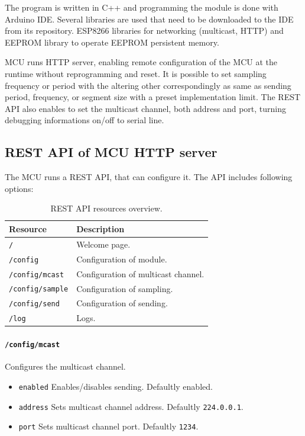 The program is written in C++ and programming the module is done with Arduino IDE. Several libraries
are used that need to be downloaded to the IDE from its repository. ESP8266 libraries for networking
(multicast, HTTP) and EEPROM library to operate EEPROM persistent memory.

MCU runs HTTP server, enabling remote configuration of the MCU at the runtime without reprogramming
and reset. It is possible to set sampling frequency or period with the altering other correspondingly
as same as sending period, frequency, or segment size with a preset implementation limit.
The REST API also enables to set the multicast channel, both address and port, turning
debugging informations on/off to serial line.

\subsection*{REST API of MCU HTTP server}
The MCU runs a REST API, that can configure it. The API includes following options:

\begin{table}[h!]
    \begin{tabular}{|l|l|} \hline
        \textbf{Resource} & \textbf{Description} \\ \hline
        \texttt{/} & Welcome page. \\ \hline
        \texttt{/config} & Configuration of module. \\ \hline
        \texttt{/config/mcast}  & Configuration of multicast channel. \\ \hline
        \texttt{/config/sample} & Configuration of sampling. \\ \hline
        \texttt{/config/send}   & Configuration of sending. \\ \hline
        \texttt{/log}         & Logs. \\ \hline
    \end{tabular}
    \caption{REST API resources overview.}
\end{table}

\paragraph{\texttt{/config/mcast}}
Configures the multicast channel.
\begin{itemize}
    \item[] \texttt{enabled} Enables/disables sending. Defaultly enabled.
    \item[] \texttt{address} Sets multicast channel address. Defaultly \texttt{224.0.0.1}.
    \item[] \texttt{port}    Sets multicast channel port. Defaultly \texttt{1234}.
\end{itemize}


